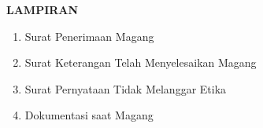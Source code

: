 \begin{center}
  \textbf{LAMPIRAN}
\end{center}


\vspace{1.5ex}

\begin{enumerate}[topsep=0pt]
  \item Surat Penerimaan Magang
  \item Surat Keterangan Telah Menyelesaikan Magang
  \item Surat Pernyataan Tidak Melanggar Etika
  \item Dokumentasi saat Magang
\end{enumerate}

